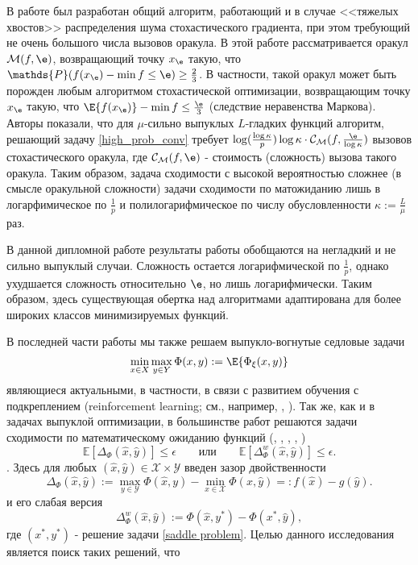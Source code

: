 В работе \cite{davis2021low} был разработан общий алгоритм, работающий и в случае <<тяжелых хвостов>> распределения шума стохастического градиента, при этом требующий не очень большого числа вызовов оракула.  В этой работе рассматривается оракул $\mathcal{M}(f, \e)$, возвращающий точку $x_{\e}$ такую, что $\mathds{P} (f(x_{\e})-\min f \le \e) \ge \frac{2}{3}$. В частности, такой оракул может быть порожден любым алгоритмом стохастической оптимизации, возвращающим точку $x_{\e}$ такую, что $\E{f(x_{\e})} - \min f \le \frac{\e}{3}$ (следствие неравенства Маркова).  Авторы показали, что для $\mu$-сильно выпуклых $L$-гладких функций алгоритм, решающий задачу \eqref{high_prob_conv} требует $\log({\frac{\log{\kappa}}{p}})\log{\kappa}\cdot \mathcal{C}_{\mathcal{M}}(f, \frac{\e}{\log{\kappa}})$ вызовов стохастического оракула, где  $\mathcal{C}_{\mathcal{M}}(f, \e)$ - стоимость (сложность) вызова такого оракула. Таким образом, задача сходимости с высокой вероятностью сложнее (в смысле оракульной сложности) задачи сходимости по матожиданию лишь в логарфимическое по $\frac{1}{p}$ и полилогарифмическое по числу обусловленности $\kappa := \frac{L}{\mu}$ раз. 

В данной дипломной работе результаты работы \cite{davis2021low} обобщаются на негладкий и не сильно выпуклый случаи. Сложность остается логарифмической по $\frac{1}{p}$, однако ухудшается сложность относительно $\e$, но лишь логарифмически. Таким образом, здесь существующая обертка над алгоритмами адаптирована для более широких классов минимизируемых функций. 

В последней части работы мы также решаем выпукло-вогнутые седловые задачи 
\begin{equation} \label{saddle problem}
    \min_{x \in X} \max_{y \in Y} \Phi (x, y) := \E{\Phi_{\xi}(x, y)}
\end{equation}
 являющиеся актуальными, в частности, в связи с  развитием обучения с подкреплением (reinforcement learning; см., например, \cite{puterman2014markov}, \cite{wang2017primal}). Так же, как и в задачах выпуклой оптимизации, в большинстве работ решаются задачи сходимости по математическому ожиданию функций (\cite{nemirovski2009robust}, \cite{shalev2013stochastic}, \cite{zhang2017stochastic}, \cite{yan2019stochastic}, \cite{zhang2021generalization}) $$\mathbb{E}[\Delta_\Phi(\hat x,\hat y)]\leq \epsilon\qquad\mbox{или}\qquad \mathbb{E}[\Delta_\Phi^w(\hat x,\hat y)]\leq \epsilon.$$. Здесь для любых $(\hat x,\hat y)\in\mathcal{X}\times\mathcal{Y}$ введен зазор двойственности 
\begin{equation}\label{gap}
    \Delta_{\Phi}(\hat{x},\hat{y}):=\max_{y\in\mathcal{Y}} \Phi(\hat{x},y)-\min_{x\in\mathcal{X}} \Phi(x,\hat{y}) =: f(\hat{x}) - g(\hat{y}).
\end{equation} 
и его слабая версия
\begin{equation} \label{weak_gap}
    \Delta^w_{\Phi}(\hat{x},\hat{y}):=\Phi(\hat{x},y^*)-\Phi(x^*,\hat{y}),
\end{equation}
где $(x^*, y^*)$ - решение задачи \eqref{saddle problem}.
Целью данного исследования является поиск таких решений, что 

